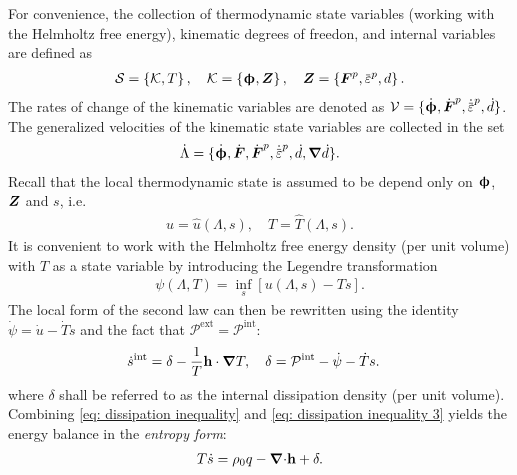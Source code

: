 For convenience, the collection of thermodynamic state variables (working with the Helmholtz free energy), kinematic degrees of freedon, and internal variables are defined as
\begin{align}
  \mathcal{S} = \left\{ \mathcal{K}, T \right\}, \quad \mathcal{K} = \left\{ \bs{\upphi}, \bfZ \right\}, \quad \bfZ = \left\{ \bfF^p, \ep, d \right\}.
\end{align}
The rates of change of the kinematic variables are denoted as $\mathcal{V} = \{ \dot{\bs{\upphi}}, \dot{\defgrad}^p, \epdot, \dot{d} \}$. The generalized velocities of the kinematic state variables are collected in the set
\begin{align}
  \dot{\Lambda} = \{ \dot{\bs{\upphi}}, \dot{\defgrad}, \dot{\defgrad}^p, \epdot, \dot{d}, \grad \dot{d} \}.
\end{align}
Recall that the local thermodynamic state is assumed to be depend only on $\boldsymbol{\upphi}$, $\boldsymbol{Z}$ and $s$, i.e.
\begin{align}
  u = \hat{u}(\Lambda, s), \quad T = \hat{T}(\Lambda, s).
\end{align}
It is convenient to work with the Helmholtz free energy density (per unit volume) with $T$ as a state variable by introducing the Legendre transformation
\begin{align}
  \psi(\Lambda, T) = \inf_s \left[ u(\Lambda, s) - Ts \right].
\end{align}
The local form of the second law can then be rewritten using the identity $\dot{\psi} = \dot{u} - \dot{T}s$ and the fact that $\mathcal{P}^\text{ext} = \mathcal{P}^\text{int}$:
\begin{align}
  \dot{s}^\text{int} & = \delta - \dfrac{1}{T} \textbf{h} \cdot \boldsymbol{\nabla} T,  \quad \delta = \mathcal{P}^\text{int} - \dot{\psi} - \dot{T}s. \label{eq: dissipation inequality 3}
\end{align}
where $\delta$ shall be referred to as the internal dissipation density (per unit volume). Combining \eqref{eq: dissipation inequality} and \eqref{eq: dissipation inequality 3} yields the energy balance in the \emph{entropy form}:
\begin{align}
  T\dot{s} = \rho_0 q - {\boldsymbol{\nabla} \cdot} \textbf{h} + \delta. \label{eq: energy balance entropy form}
\end{align}

